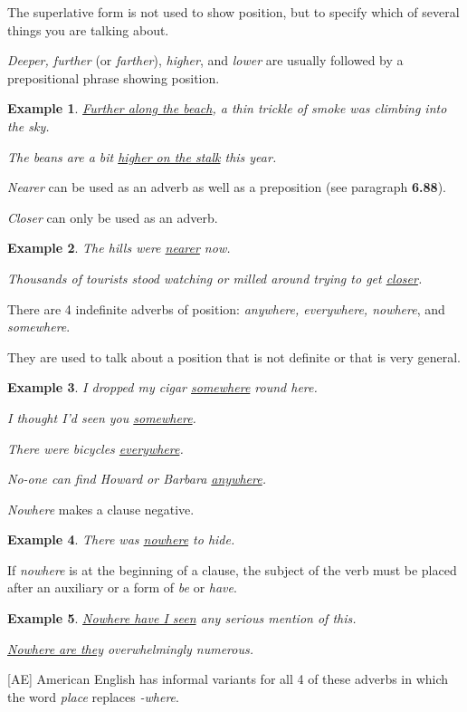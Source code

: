\documentclass[oneside]{book}
\numberwithin{equation}{section}
\newtheorem{example}{Example}[section]
\begin{document}
The superlative form is not used to show position, but to specify which of several things you are talking about.

%
\textit{Deeper, further} (or \textit{farther}), \textit{higher}, and \textit{lower} are usually followed by a prepositional phrase showing position.
\begin{example}
    \underline{Further along the beach}, a thin trickle of smoke was climbing into the sky.
    
    The beans are a bit \underline{higher on the stalk} this year.
\end{example}
\textit{Nearer} can be used as an adverb as well as a preposition (see paragraph \textbf{6.88}).

%
\textit{Closer} can only be used as an adverb.
\begin{example}
    The hills were \underline{nearer} now.
    
    Thousands of tourists stood watching or milled around trying to get \underline{closer}.
\end{example}
%
\noindent{} There are 4 indefinite adverbs of position: \textit{anywhere, everywhere, nowhere}, and \textit{somewhere}.

They are used to talk about a position that is not definite or that is very general.
\begin{example}
    I dropped my cigar \underline{somewhere} round here.
    
    I thought I'd seen you \underline{somewhere}.
    
    There were bicycles \underline{everywhere}.
    
    No-one can find Howard or Barbara \underline{anywhere}.
\end{example}
\textit{Nowhere} makes a clause negative.
\begin{example}
    There was \underline{nowhere} to hide.
\end{example}
If \textit{nowhere} is at the beginning of a clause, the subject of the verb must be placed after an auxiliary or a form of \textit{be} or \textit{have}.
\begin{example}
    \underline{Nowhere have I seen} any serious mention of this.
    
    \underline{Nowhere are they} overwhelmingly numerous.
\end{example}
%
[AE] American English has informal variants for all 4 of these adverbs in which the word \textit{place} replaces \textit{-where}.
\end{document}
